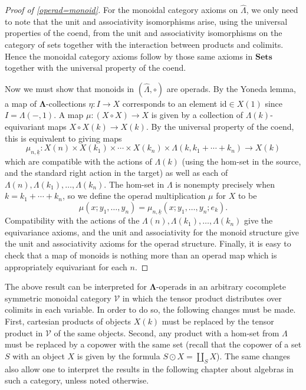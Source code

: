 \documentclass{amsbook} %
\newcommand{\mb}{\mathbf}
\newcommand{\id}{\textrm{id}}
\newcommand{\ML}{\mathbf{\Lambda}}
\numberwithin{section}{chapter}
\begin{document}
\begin{proof}[Proof of \ref{operad=monoid}]
For the monoidal category axioms on $\hat{\mathbb{\Lambda}}$, we only need to note that the unit and associativity isomorphisms arise, using the universal properties of the coend, from the unit and associativity isomorphisms on the category of sets together with the interaction between products and colimits.  Hence the monoidal category axioms follow by those same axioms in $\mb{Sets}$ together with the universal property of the coend.

Now we must show that monoids in $(\hat{\mathbb{\Lambda}}, \circ)$ are operads.  By the Yoneda lemma, a map of $\ML$-collections $\eta \colon I \rightarrow X$ corresponds to an element $\id \in X(1)$ since $I = \mathbb{\Lambda}(-,1)$.  A map $\mu \colon (X \circ X) \rightarrow X$ is given by a collection of $\Lambda(k)$-equivariant maps $X \circ X (k) \rightarrow X(k)$.  By the universal property of the coend, this is equivalent to giving maps
  \[
    \mu_{n, \underline{k}} \colon X(n) \times X(k_{1}) \times \cdots \times X(k_{n}) \times \mathbb{\Lambda}(k, k_{1}+\cdots +k_{n}) \rightarrow X(k)
  \]
which are compatible with the actions of $\Lambda(k)$ (using the hom-set in the source, and the standard right action in the target) as well as each of $\Lambda(n), \Lambda(k_{1}), \ldots, \Lambda(k_{n})$.  The hom-set in $\mathbb{\Lambda}$ is nonempty precisely when $k=k_{1} + \cdots + k_{n}$, so we define the operad multiplication $\mu$ for $X$ to be
  \[
    \mu (x; y_{1}, \ldots, y_{n}) = \mu_{n, \underline{k}}(x; y_{1}, \ldots, y_{n}; e_{k}).
  \]
Compatibility with the actions of the  $\Lambda(n), \Lambda(k_{1}), \ldots, \Lambda(k_{n})$ give the equivariance axioms, and the unit and associativity for the monoid structure give the unit and associativity axioms for the operad structure.  Finally, it is easy to check that a map of monoids is nothing more than an operad map which is appropriately equivariant for each $n$.
\end{proof}

\begin{rem}
The above result can be interpreted for $\ML$-operads in an arbitrary cocomplete symmetric monoidal category $\mathcal{V}$ in which the tensor product distributes over colimits in each variable. In order to do so, the following changes must be made.  First, cartesian products of objects $X(k)$ must be replaced by the tensor product in $\mathcal{V}$ of the same objects.  Second, any product with a hom-set from $\mathbb{\Lambda}$ must be replaced by a copower with the same set (recall that the copower of a set $S$ with an object $X$ is given by the formula $S \odot X = \coprod_{S} X$).  The same changes also allow one to interpret the results in the following chapter about algebras in such a category, unless noted otherwise.
\end{rem}
\end{document}
